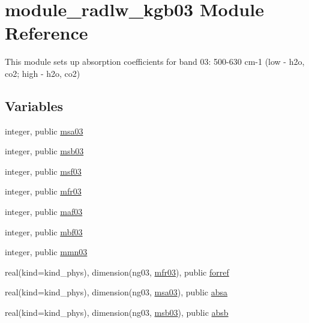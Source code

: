 \hypertarget{namespacemodule__radlw__kgb03}{}\section{module\+\_\+radlw\+\_\+kgb03 Module Reference}
\label{namespacemodule__radlw__kgb03}


This module sets up absorption coefficients for band 03\+: 500-\/630 cm-\/1 (low -\/ h2o, co2; high -\/ h2o, co2)  


\subsection*{Variables}
\begin{DoxyCompactItemize}
\item 
integer, public \hyperlink{namespacemodule__radlw__kgb03_a78658032153f7a4cbeaa198cbe661244}{msa03}
\item 
integer, public \hyperlink{namespacemodule__radlw__kgb03_ac57ba9584cbc3a5e4e2e0a6b548d21e9}{msb03}
\item 
integer, public \hyperlink{namespacemodule__radlw__kgb03_af553bb46aa3ea6bcbb945cb2c2778955}{msf03}
\item 
integer, public \hyperlink{namespacemodule__radlw__kgb03_a4ea1e58a39585adc087718b92a16b529}{mfr03}
\item 
integer, public \hyperlink{namespacemodule__radlw__kgb03_a90d1081db011f0682cb4a83c40c5bb23}{maf03}
\item 
integer, public \hyperlink{namespacemodule__radlw__kgb03_a655fff8711d78d62ae9d4fa27d02621a}{mbf03}
\item 
integer, public \hyperlink{namespacemodule__radlw__kgb03_ab4e84b10460930267256c0e5a1fe7a55}{mmn03}
\item 
real(kind=kind\+\_\+phys), dimension(ng03, \hyperlink{namespacemodule__radlw__kgb03_a4ea1e58a39585adc087718b92a16b529}{mfr03}), public \hyperlink{namespacemodule__radlw__kgb03_afcc55fa81ba6369b56d29db2342c2e6a}{forref}
\item 
real(kind=kind\+\_\+phys), dimension(ng03, \hyperlink{namespacemodule__radlw__kgb03_a78658032153f7a4cbeaa198cbe661244}{msa03}), public \hyperlink{namespacemodule__radlw__kgb03_ac65fd4afedbd4bfa2c87c5e4f060a1d4}{absa}
\item 
real(kind=kind\+\_\+phys), dimension(ng03, \hyperlink{namespacemodule__radlw__kgb03_ac57ba9584cbc3a5e4e2e0a6b548d21e9}{msb03}), public \hyperlink{namespacemodule__radlw__kgb03_aa84ba66e0a3cc018b03bd13c9c21e133}{absb}

\end{DoxyCompactItemize}
